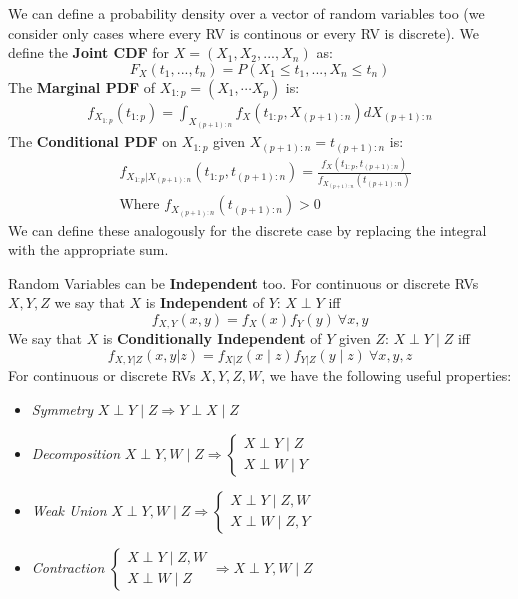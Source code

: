 \documentclass[]{article}
\theoremstyle{mattstyle}
\theoremstyle{definition}
\begin{document}
We can define a probability density over a vector of random variables too (we consider only cases where every RV is continous or every RV is discrete). We define the \textbf{Joint CDF} for \( X = (X_1, X_2, ..., X_n)\) as: 
$$F_X(t_1,...,t_n)=P(X_1 \le t_1, ..., X_n \le t_n)$$
The \textbf{Marginal PDF} of \(X_{1:p} = (X_{1}, \cdots X_{p})\) is:
	\begin{align*}
	f_{X_{1:p}}\left(t_{1:p}\right) = \int_{X_{(p+1):n}}f_{X}\left(t_{1:p}, X_{(p+1):n}\right)dX_{(p+1):n}
	\end{align*}
The \textbf{Conditional PDF} on \(X_{1:p}\) given \(X_{(p+1):n}=t_{(p+1):n}\) is:
	\begin{align*}
	&f_{X_{1:p} | X_{(p+1):n}}\left(t_{1:p}, t_{(p+1):n}\right) =\frac{f_{X}\left(t_{1:p}, t_{(p+1):n}\right)}{f_{X_{(p+1):n}}\left(t_{(p+1):n}\right)}\\
	&\text{Where $f_{X_{(p+1):n}}\left(t_{(p+1):n}\right) > 0$}
	\end{align*}
We can define these analogously for the discrete case by replacing the integral with the appropriate sum.

\newpage

Random Variables can be \textbf{Independent} too. For continuous or discrete RVs $X,Y, Z$ we say that $X$ is \textbf{Independent} of $Y$: $X \perp Y$ iff
$$ f_{X,Y}(x,y) = f_X(x)f_Y(y) \ \forall x,y$$
We say that $X$ is \textbf{Conditionally Independent} of $Y$ given $Z$: $X 	\perp Y \mid Z$ iff 
$$f_{X,Y| Z}(x,y|z) = f_{X|Z}(x \mid z)f_{Y|Z}(y \mid z) \ \forall x,y,z$$
For continuous or discrete RVs $X,Y,Z,W$, we have the following useful properties:

\begin{itemize}
	\item \emph{Symmetry} $X \perp Y \mid Z \Rightarrow Y \perp X \mid Z$ 
	\item  \emph{Decomposition} $X \perp Y,W \mid Z \Rightarrow 
	\begin{cases}
	X \perp Y \mid Z \\
	X \perp W \mid Y
	\end{cases}$ 
	\item \emph{Weak Union} $X \perp Y,W \mid Z \Rightarrow 	
	\begin{cases}
	X \perp Y \mid Z, W \\
	X \perp W \mid Z, Y
	\end{cases}$ 
	\item \emph{Contraction} $\begin{cases}
	X \perp Y \mid Z,W \\
	X \perp W \mid Z
	\end{cases}
	\Rightarrow X \perp Y, W \mid Z
	$ 
\end{itemize}
\end{document}
